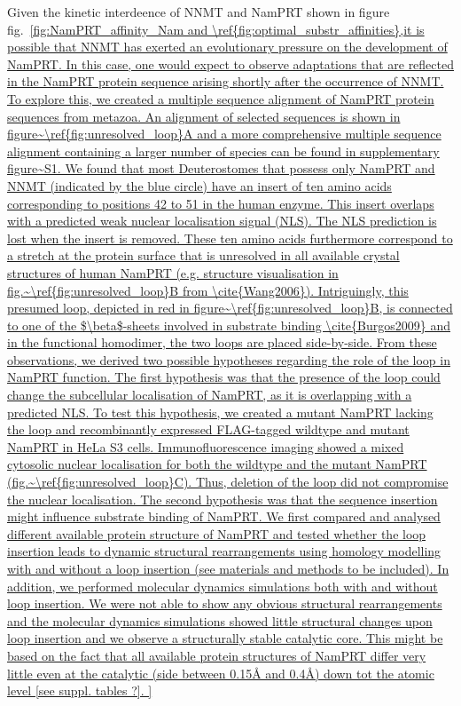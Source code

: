 Given the kinetic interdeence of  NNMT and NamPRT shown in figure fig.~\ref{fig:NamPRT_affinity_Nam and \ref{fig:optimal_substr_affinities},it is possible that NNMT has exerted an evolutionary pressure on the development of NamPRT. In this case, one would expect to observe adaptations that are reflected in the NamPRT protein sequence arising shortly after the occurrence of NNMT. To explore this, we created a multiple sequence alignment of NamPRT protein sequences from metazoa. An alignment of selected sequences is shown in figure~\ref{fig:unresolved_loop}A and a more comprehensive multiple sequence alignment containing a larger number of species can be found in supplementary figure~S1. We found that most Deuterostomes that possess only NamPRT and NNMT (indicated by the blue circle) have an insert of ten amino acids corresponding to positions 42 to 51 in the human enzyme. This insert overlaps with a predicted weak nuclear localisation signal (NLS). The NLS prediction is lost when the insert is removed. These ten amino acids furthermore correspond to a stretch at the protein surface that is unresolved in all available crystal structures of human NamPRT (e.g. structure visualisation in fig.~\ref{fig:unresolved_loop}B from \cite{Wang2006}). Intriguingly, this presumed loop, depicted in red in figure~\ref{fig:unresolved_loop}B, is connected to one of the $\beta$-sheets involved in substrate binding \cite{Burgos2009} and in the functional homodimer, the two loops are placed side-by-side.

From these observations, we derived two possible hypotheses regarding the role of the loop in NamPRT function. The first hypothesis was that the presence of the loop could change the subcellular localisation of NamPRT, as it is overlapping with a predicted NLS. To test this hypothesis, we created a mutant NamPRT lacking the loop and recombinantly expressed FLAG-tagged wildtype and mutant NamPRT in HeLa S3 cells. Immunofluorescence imaging showed a mixed cytosolic nuclear localisation for both the wildtype and the mutant NamPRT (fig.~\ref{fig:unresolved_loop}C). Thus, deletion of the loop did not compromise the nuclear localisation.

The second hypothesis was that the sequence insertion might influence substrate binding of NamPRT.  We first compared and analysed different available protein structure of NamPRT and tested whether  the loop insertion leads to dynamic structural rearrangements using homology modelling with and without a loop insertion (see materials and methods to be included). In addition, we performed molecular dynamics simulations both with and without loop insertion. We were not able to show any obvious structural rearrangements and  the molecular dynamics simulations showed little structural changes upon loop insertion and we observe a structurally stable catalytic core. This might be based on the fact that  all available protein structures of NamPRT differ very little even at the catalytic (side between 0.15Å and 0.4Å)  down tot the atomic level  [see suppl. tables ?]. 

}

